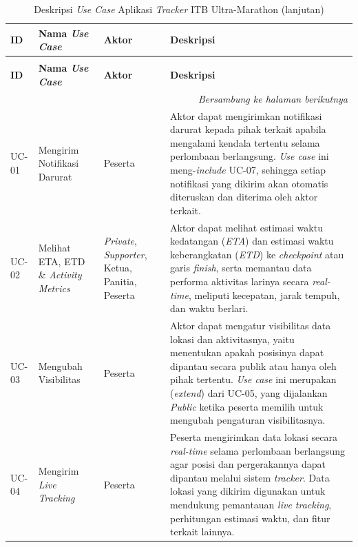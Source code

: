 \begin{longtable}{|p{1cm}|p{3.5cm}|p{3.2cm}|p{5.5cm}|}
\caption{Deskripsi \textit{Use Case} Aplikasi \textit{Tracker} ITB Ultra-Marathon}
\label{tab:usecase-deskripsi} \\
\hline
\textbf{ID} & \textbf{Nama \textit{Use Case}} & \textbf{Aktor} & \textbf{Deskripsi} \\ \hline
\endfirsthead

\caption[]{Deskripsi \textit{Use Case} Aplikasi \textit{Tracker} ITB Ultra-Marathon (lanjutan)} \\
\hline
\textbf{ID} & \textbf{Nama \textit{Use Case}} & \textbf{Aktor} & \textbf{Deskripsi} \\ \hline
\endhead

\hline
\multicolumn{4}{r}{\textit{Bersambung ke halaman berikutnya}} \\
\endfoot

\hline
\endlastfoot

UC-01 & Mengirim Notifikasi Darurat & Peserta &
Aktor dapat mengirimkan notifikasi darurat kepada pihak terkait apabila
mengalami kendala tertentu selama perlombaan
berlangsung. \textit{Use case} ini meng-\textit{include} UC-07, sehingga setiap notifikasi yang dikirim
akan otomatis diteruskan dan diterima oleh aktor terkait. \\ \hline

UC-02 & Melihat ETA, ETD \& \textit{Activity Metrics} & \textit{Private}, \textit{Supporter}, Ketua, Panitia, Peserta &
Aktor dapat melihat estimasi waktu kedatangan (\textit{ETA}) dan estimasi
waktu keberangkatan (\textit{ETD}) ke \textit{checkpoint} atau garis
\textit{finish}, serta memantau data performa aktivitas larinya secara
\textit{real-time}, meliputi kecepatan, jarak tempuh, dan waktu berlari. \\ \hline

UC-03 & Mengubah Visibilitas & Peserta &
Aktor dapat mengatur visibilitas data lokasi dan aktivitasnya,
yaitu menentukan apakah posisinya dapat dipantau secara publik atau hanya
oleh pihak tertentu. \textit{Use case} ini merupakan
(\textit{extend}) dari UC-05, yang dijalankan \textit{Public} ketika peserta memilih untuk mengubah
pengaturan visibilitasnya. \\ \hline

UC-04 & Mengirim \textit{Live Tracking} & Peserta &
Peserta mengirimkan data lokasi secara \textit{real-time} selama perlombaan
berlangsung agar posisi dan pergerakannya dapat dipantau melalui sistem
\textit{tracker}. Data lokasi yang dikirim digunakan untuk mendukung
pemantauan \textit{live tracking}, perhitungan estimasi waktu, dan fitur
terkait lainnya. \\ \hline


\end{longtable}
